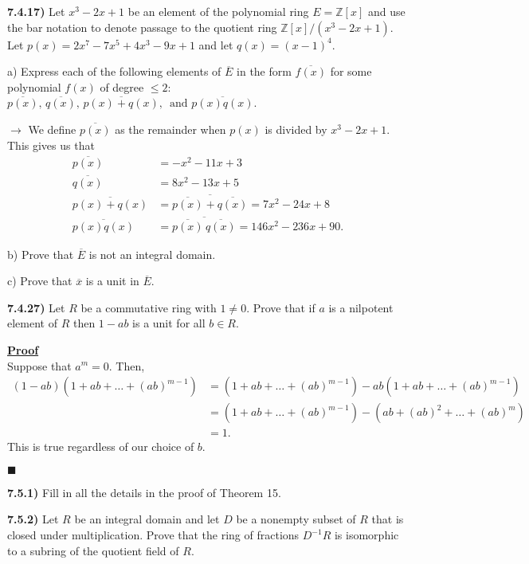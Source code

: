 \documentclass[12pt,a4paper]{article}
\newcommand{\prob}[2]{\textbf{#1)} #2}
\newenvironment{proof}
{
\textbf{\underline{Proof}} \\
}
{
\begin{flushright}
$\blacksquare$
\end{flushright}}
\begin{document}
\prob{7.4.17}{
    Let $x^3 - 2x + 1$ be an element of the polynomial ring $E = \mathbb{Z}[x]$ and use the bar notation to denote passage to the quotient ring $\mathbb{Z}[x]/(x^3 - 2x + 1)$.
    Let $p(x) = 2x^7 - 7x^5 + 4x^3 - 9x + 1$ and let $q(x) = \left( x - 1 \right)^{4}$.
}

a) Express each of the following elements of $\overline{E}$ in the form $\overline{f(x)}$ for some polynomial $f(x)$ of degree $\leq 2$: $\overline{p(x)},\,\overline{q(x)},\,\overline{p(x) + q(x)},\,\text{ and } \overline{p(x)q(x)}$.

$\rightarrow$ We define $\overline{p(x)}$ as the remainder when $p(x)$ is divided by $x^3 - 2x + 1$.
This gives us that 
\begin{align*}
    \overline{p(x)} &= -x^2 - 11x + 3 \\
    \overline{q(x)} &= 8x^2 - 13x + 5 \\
    \overline{p(x) + q(x)} &= \overline{\overline{p(x)} + \overline{q(x)}} = 7x^2 - 24x + 8 \\
    \overline{p(x)q(x)} &= \overline{\overline{p(x)}\,\overline{q(x)}} = 146x^2 - 236x + 90 
.\end{align*}

b) Prove that $\overline{E}$ is not an integral domain.

c) Prove that $\overline{x}$ is a unit in $\overline{E}$.

\prob{7.4.27}{
Let $R$ be a commutative ring with $1 \ne 0$.
Prove that if $a$ is a nilpotent element of $R$ then $1 - ab$ is a unit for all $b \in R$.
}

\begin{proof}
    Suppose that $a^{m} = 0$.
    Then, 
    \begin{align*}
        (1-ab)(1 + ab + \ldots + (ab)^{m-1}) &= (1 + ab + \ldots + (ab)^{m-1}) - ab(1 + ab + \ldots + (ab)^{m-1}) \\
        &= (1 + ab + \ldots + (ab)^{m-1}) - (ab + (ab)^2 + \ldots + (ab)^{m}) \\
        &= 1
    .\end{align*} 
    This is true regardless of our choice of $b$.
\end{proof}

\prob{7.5.1}{
    Fill in all the details in the proof of Theorem 15.
}

\prob{7.5.2}{
Let $R$ be an integral domain and let $D$ be a nonempty subset of $R$ that is closed under multiplication.
Prove that the ring of fractions $D^{-1}R$ is isomorphic to a subring of the quotient field of $R$.
}
\end{document}
